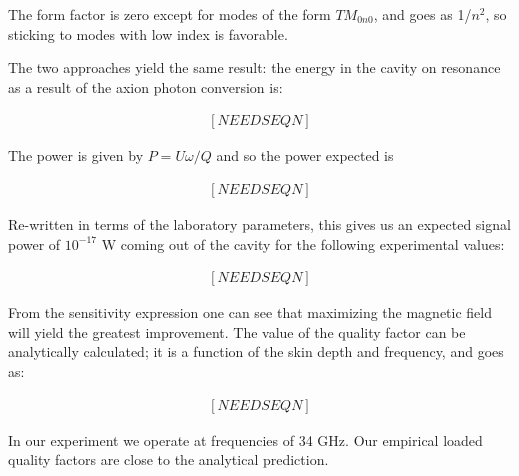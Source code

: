 \documentclass[11pt]{book}
\begin{document}
The form factor is zero except for modes of the form $TM_{0n0}$, and goes as 1/$n^2$, so sticking to modes with low index is favorable.

The two approaches yield the same result: the energy in the cavity on resonance as a result of the axion photon conversion is:

\begin{eqnarray}

[NEEDSEQN]

\end{eqnarray}

The power is given by $P = U\omega/Q$ and so the power expected is

\begin{eqnarray}

[NEEDSEQN]

\end{eqnarray}

Re-written in terms of the laboratory parameters, this gives us an expected signal power of $10^{-17}$ W coming out of the cavity for the following experimental values:

\begin{eqnarray}

[NEEDSEQN]

\end{eqnarray}

From the sensitivity expression one can see that maximizing the magnetic field will yield the greatest improvement. The value of the quality factor can be analytically calculated; it is a function of the skin depth and frequency, and goes as:

\begin{eqnarray}

[NEEDSEQN]

\end{eqnarray}

In our experiment we operate at frequencies of 34 GHz. Our empirical loaded quality factors are close to the analytical prediction.
\end{document}
